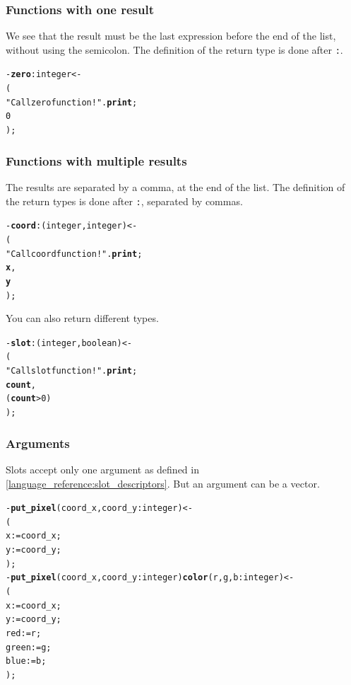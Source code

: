 \documentclass[11pt]{mybook}
\begin{document}
\subsubsection{Functions with one result}
\label{language_reference:lists:use:functions}
We see that the result must be the last expression before the end of the list, without using the semicolon.
The definition of the return type is done after {\tt :}.
\begin{alltt}
  - {\bf{}zero}:{\sc{}integer} <-
  (
     "Call zero function !".{\bf{}print};
     0
  );                          
\end{alltt}

\subsubsection{Functions with multiple results}
\label{language_reference:lists:use:functions_multiple}
The results are separated by a comma, at the end of the list.
The definition of the return types is done after {\tt :}, separated by commas.
\begin{alltt}
  - {\bf{}coord}:({\sc{}integer,integer}) <-
  (
     "Call coord function !".{\bf{}print};
     {\bf{}x},
     {\bf{}y}
  );                          
\end{alltt}
You can also return different types.
\begin{alltt}
  - {\bf{}slot}:({\sc{}integer,boolean}) <-
  (
     "Call slot function !".{\bf{}print};
     {\bf{}count},
     ({\bf{}count} > 0)
  );                          
\end{alltt}

\subsubsection{Arguments}
\label{language_reference:lists:use:arguments}
Slots accept only one argument as defined in {\ref{language_reference:slot_descriptors}}. But an argument can be a vector.
\begin{alltt}
  - {\bf{}put\_pixel} (coord\_x,coord\_y:{\sc{}integer}) <-
  (
     x := coord\_x;
     y := coord\_y;
  ); \\                         

  - {\bf{}put\_pixel} (coord\_x,coord\_y:{\sc{}integer}) {\bf{}color} (r,g,b:{\sc{}integer}) <-
  (
     x := coord\_x;
     y := coord\_y;
     red := r;
     green := g;
     blue := b;
  );                          
\end{alltt}
\end{document}
